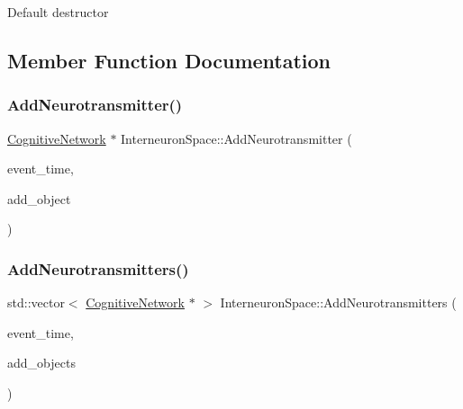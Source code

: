Default destructor 

\subsection{Member Function Documentation}
\mbox{\label{classInterneuronSpace_afee7374310b2a8c08bac232d62ea7aa1}} 
\subsubsection{\texorpdfstring{Add\+Neurotransmitter()}{AddNeurotransmitter()}}
{\footnotesize\ttfamily \mbox{\hyperlink{classCognitiveNetwork}{Cognitive\+Network}} $\ast$ Interneuron\+Space\+::\+Add\+Neurotransmitter (\begin{DoxyParamCaption}\item[{std\+::chrono\+::time\+\_\+point$<$ \mbox{\hyperlink{universe_8h_a0ef8d951d1ca5ab3cfaf7ab4c7a6fd80}{Clock}} $>$}]{event\+\_\+time,  }\item[{\mbox{\hyperlink{classCognitiveNetwork}{Cognitive\+Network}} $\ast$}]{add\+\_\+object }\end{DoxyParamCaption})}

\mbox{\label{classInterneuronSpace_a1049397cd511c753d8c178db8f68a1a7}} 
\subsubsection{\texorpdfstring{Add\+Neurotransmitters()}{AddNeurotransmitters()}}
{\footnotesize\ttfamily std\+::vector$<$ \mbox{\hyperlink{classCognitiveNetwork}{Cognitive\+Network}} $\ast$ $>$ Interneuron\+Space\+::\+Add\+Neurotransmitters (\begin{DoxyParamCaption}\item[{std\+::chrono\+::time\+\_\+point$<$ \mbox{\hyperlink{universe_8h_a0ef8d951d1ca5ab3cfaf7ab4c7a6fd80}{Clock}} $>$}]{event\+\_\+time,  }\item[{std\+::vector$<$ \mbox{\hyperlink{classCognitiveNetwork}{Cognitive\+Network}} $\ast$$>$}]{add\+\_\+objects }\end{DoxyParamCaption})}

